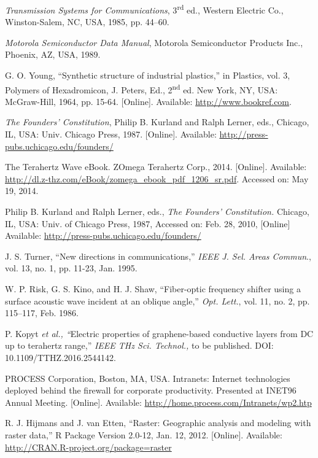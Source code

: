 \documentclass{ieeeaccess}
\begin{document}
\begin{thebibliography}{00}
 \emph{Transmission Systems for Communications}, 3\textsuperscript{rd} ed., Western Electric Co., Winston-Salem, NC, USA, 1985, pp. 44--60.

 \emph{Motorola Semiconductor Data Manual}, Motorola Semiconductor Products Inc., Phoenix, AZ, USA, 1989.

 G. O. Young, ``Synthetic structure of industrial
plastics,'' in Plastics, vol. 3, Polymers of Hexadromicon, J. Peters,
Ed., 2\textsuperscript{nd} ed. New York, NY, USA: McGraw-Hill, 1964, pp. 15-64.
[Online]. Available:
\underline{http://www.bookref.com}.

 \emph{The Founders' Constitution}, Philip B. Kurland
and Ralph Lerner, eds., Chicago, IL, USA: Univ. Chicago Press, 1987.
[Online]. Available: \underline{http://press-pubs.uchicago.edu/founders/}

 The Terahertz Wave eBook. ZOmega Terahertz Corp., 2014.
[Online]. Available:
\underline{http://dl.z-thz.com/eBook/zomega\_ebook\_pdf\_1206\_sr.pdf}. Accessed on: May 19, 2014.

 Philip B. Kurland and Ralph Lerner, eds., \emph{The
Founders' Constitution.} Chicago, IL, USA: Univ. of Chicago Press,
1987, Accessed on: Feb. 28, 2010, [Online] Available:
\underline{http://press-pubs.uchicago.edu/founders/}

 J. S. Turner, ``New directions in communications,'' \emph{IEEE J. Sel. Areas Commun}., vol. 13, no. 1, pp. 11-23, Jan. 1995.

 W. P. Risk, G. S. Kino, and H. J. Shaw, ``Fiber-optic frequency shifter using a surface acoustic wave incident at an oblique angle,'' \emph{Opt. Lett.}, vol. 11, no. 2, pp. 115--117, Feb. 1986.

 P. Kopyt \emph{et al., ``}Electric properties of graphene-based conductive layers from DC up to terahertz range,'' \emph{IEEE THz Sci. Technol.,} to be published. DOI: 10.1109/TTHZ.2016.2544142.

 PROCESS Corporation, Boston, MA, USA. Intranets:
Internet technologies deployed behind the firewall for corporate
productivity. Presented at INET96 Annual Meeting. [Online].
Available: \underline{http://home.process.com/Intranets/wp2.htp}

 R. J. Hijmans and J. van Etten, ``Raster: Geographic analysis and modeling with raster data,'' R Package Version 2.0-12, Jan. 12, 2012. [Online]. Available: \underline {http://CRAN.R-project.org/package=raster} 


\end{thebibliography}
\end{document}
